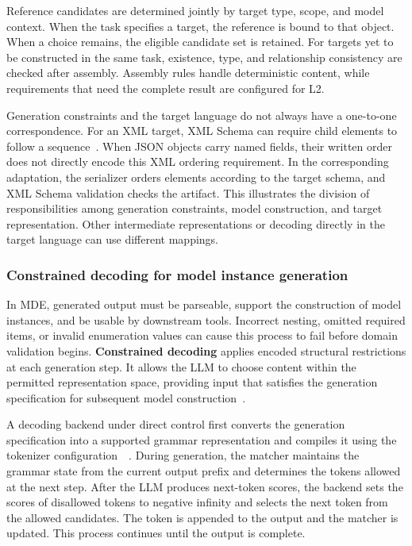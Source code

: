 \documentclass[pdflatex,iicol,sn-mathphys-num]{sn-jnl}
\newcommand{\paperref}[1]{~\citep{#1}}
\begin{document}
Reference candidates are determined jointly by target type, scope, and model context. When the task specifies a target, the reference is bound to that object. When a choice remains, the eligible candidate set is retained. For targets yet to be constructed in the same task, existence, type, and relationship consistency are checked after assembly. Assembly rules handle deterministic content, while requirements that need the complete result are configured for L2.


Generation constraints and the target language do not always have a one-to-one correspondence. For an XML target, XML Schema can require child elements to follow a sequence\paperref{W3C2004XMLSchemaStructures}. When JSON objects carry named fields, their written order does not directly encode this XML ordering requirement. In the corresponding adaptation, the serializer orders elements according to the target schema, and XML Schema validation checks the artifact. This illustrates the division of responsibilities among generation constraints, model construction, and target representation. Other intermediate representations or decoding directly in the target language can use different mappings.


\subsubsection{Constrained decoding for model instance generation}\label{sec:method-3-5-2}

In MDE, generated output must be parseable, support the construction of model instances, and be usable by downstream tools. Incorrect nesting, omitted required items, or invalid enumeration values can cause this process to fail before domain validation begins. \textbf{Constrained decoding} applies encoded structural restrictions at each generation step. It allows the LLM to choose content within the permitted representation space, providing input that satisfies the generation specification for subsequent model construction\paperref{geng-etal-2023-grammar}.


A decoding backend under direct control first converts the generation specification into a supported grammar representation and compiles it using the tokenizer configuration\paperref{MLSYS2025_5c20ca4b}\paperref{Li_2026}. During generation, the matcher maintains the grammar state from the current output prefix and determines the tokens allowed at the next step. After the LLM produces next-token scores, the backend sets the scores of disallowed tokens to negative infinity and selects the next token from the allowed candidates. The token is appended to the output and the matcher is updated. This process continues until the output is complete.
\end{document}
